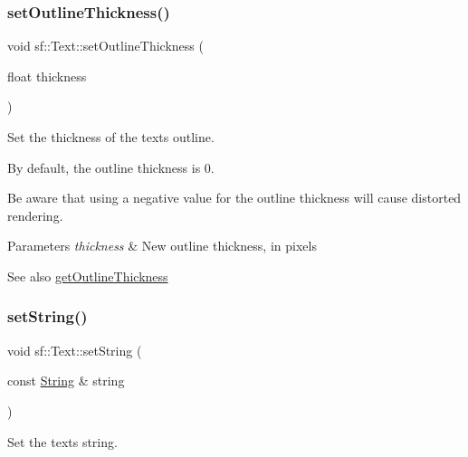 \subsubsection{\texorpdfstring{setOutlineThickness()}{setOutlineThickness()}}
{\footnotesize\ttfamily void sf\+::\+Text\+::set\+Outline\+Thickness (\begin{DoxyParamCaption}\item[{float}]{thickness }\end{DoxyParamCaption})}



Set the thickness of the text\textquotesingle{}s outline. 

By default, the outline thickness is 0.

Be aware that using a negative value for the outline thickness will cause distorted rendering.


\begin{DoxyParams}{Parameters}
{\em thickness} & New outline thickness, in pixels\\
\hline
\end{DoxyParams}
\begin{DoxySeeAlso}{See also}
\mbox{\hyperlink{classsf_1_1_text_af6bf01c23189edf52c8b38708db6f3f6}{get\+Outline\+Thickness}} \begin{DoxyVerb}\end{DoxyVerb}
 
\end{DoxySeeAlso}
\mbox{\label{classsf_1_1_text_a7d3b3359f286fd9503d1ced25b7b6c33}} 
\subsubsection{\texorpdfstring{setString()}{setString()}}
{\footnotesize\ttfamily void sf\+::\+Text\+::set\+String (\begin{DoxyParamCaption}\item[{const \mbox{\hyperlink{classsf_1_1_string}{String}} \&}]{string }\end{DoxyParamCaption})}



Set the text\textquotesingle{}s string. 

